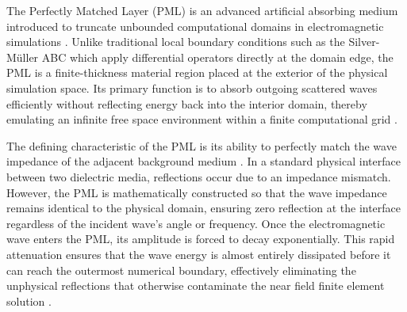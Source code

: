 The Perfectly Matched Layer (PML) is an advanced artificial absorbing medium introduced to truncate unbounded computational domains in electromagnetic simulations \citep{Berenger1994}. Unlike traditional local boundary conditions such as the Silver-M\"{u}ller ABC which apply differential operators directly at the domain edge, the PML is a finite-thickness material region placed at the exterior of the physical simulation space. Its primary function is to absorb outgoing scattered waves efficiently without reflecting energy back into the interior domain, thereby emulating an infinite free space environment within a finite computational grid \citep{Berenger1994}.

\vspace{12pt}

The defining characteristic of the PML is its ability to perfectly match the wave impedance of the adjacent background medium \citep{Berenger1994}. In a standard physical interface between two dielectric media, reflections occur due to an impedance mismatch. However, the PML is mathematically constructed so that the wave impedance remains identical to the physical domain, ensuring zero reflection at the interface regardless of the incident wave's angle or frequency. Once the electromagnetic wave enters the PML, its amplitude is forced to decay exponentially. This rapid attenuation ensures that the wave energy is almost entirely dissipated before it can reach the outermost numerical boundary, effectively eliminating the unphysical reflections that otherwise contaminate the near field finite element solution \citep{Bao2005}.

\vspace{12pt}

